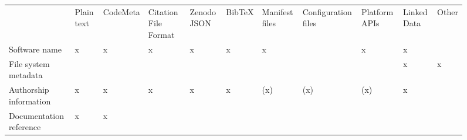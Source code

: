 \documentclass{article}
\begin{document}
\begin{figure}
\begin{tabular}{lllllllllll}


& Plain text

& CodeMeta

& Citation File Format

& Zenodo JSON

& BibTeX

& Manifest files

& Configuration files

& Platform APIs

& Linked Data

& Other

\\
Software name

& x

& x

& x

& x

& x

& x

& 

& x

& x

& 

\\
File system metadata

& 

& 

& 

& 

& 

& 

& 

& 

& x

& x

\\
Authorship information

& x

& x

& x

& x

& x

& (x)

& (x)

& (x)

& x

& 

\\
Documentation reference

& x

& x

& 


\end{tabular}
\end{figure}
\end{document}
